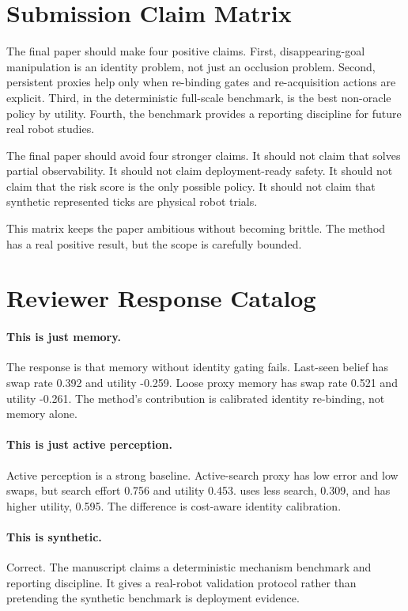 \section{Submission Claim Matrix}

The final paper should make four positive claims. First, disappearing-goal manipulation is an identity problem, not just an occlusion problem. Second, persistent proxies help only when re-binding gates and re-acquisition actions are explicit. Third, in the deterministic full-scale benchmark, \method is the best non-oracle policy by utility. Fourth, the benchmark provides a reporting discipline for future real robot studies.

The final paper should avoid four stronger claims. It should not claim that \method solves partial observability. It should not claim deployment-ready safety. It should not claim that the risk score is the only possible policy. It should not claim that synthetic represented ticks are physical robot trials.

This matrix keeps the paper ambitious without becoming brittle. The method has a real positive result, but the scope is carefully bounded.

\section{Reviewer Response Catalog}

\paragraph{This is just memory.}
The response is that memory without identity gating fails. Last-seen belief has swap rate 0.392 and utility -0.259. Loose proxy memory has swap rate 0.521 and utility -0.261. The method's contribution is calibrated identity re-binding, not memory alone.

\paragraph{This is just active perception.}
Active perception is a strong baseline. Active-search proxy has low error and low swaps, but search effort 0.756 and utility 0.453. \method uses less search, 0.309, and has higher utility, 0.595. The difference is cost-aware identity calibration.

\paragraph{This is synthetic.}
Correct. The manuscript claims a deterministic mechanism benchmark and reporting discipline. It gives a real-robot validation protocol rather than pretending the synthetic benchmark is deployment evidence.

